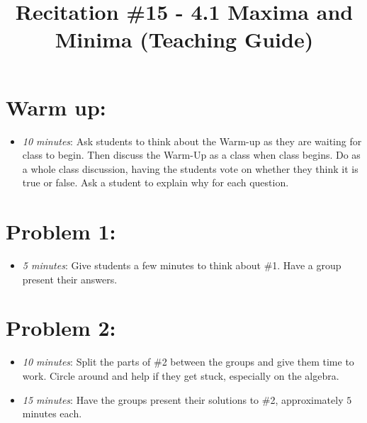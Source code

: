 \documentclass[handout,nooutcomes]{ximera}
\title{Recitation \#15 - 4.1 Maxima and Minima (Teaching Guide)}
\begin{document}
\begin{abstract}		\end{abstract}
\maketitle


\section*{Warm up:} 
	
	\begin{itemize}
	
	\item  \emph{10 minutes}:  Ask students to think about the Warm-up as they are waiting for class to begin.  Then discuss the Warm-Up as a class when class begins.  Do as a whole class discussion, having the students vote on whether they think it is true or false.  Ask a student to explain why for each question.
	
	
	
	\end{itemize}


\section*{Problem 1:}

	\begin{itemize}
	
	\item  \emph{5 minutes}:  Give students a few minutes to think about \#1.  Have a group present their answers.
	
	\end{itemize}



\section*{Problem 2:}

	\begin{itemize}
	
	\item  \emph{10 minutes}:  Split the parts of \#2 between the groups and give them time to work.  Circle around and help if they get stuck, especially on the algebra.
		
	\item  \emph{15 minutes}:  Have the groups present their solutions to \#2, approximately $5$ minutes each.  
			
	\end{itemize}
	
\end{document}
